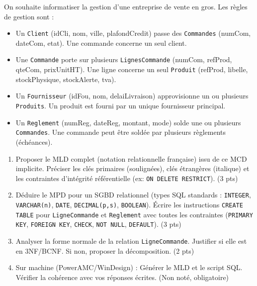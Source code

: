 \documentclass[11pt]{article}
\begin{document}
\begin{exercice}
On souhaite informatiser la gestion d'une entreprise de vente en gros. Les règles de gestion sont :
\begin{itemize}
    \item Un \texttt{Client} (idCli, nom, ville, plafondCredit) passe des \texttt{Commandes} (numCom, dateCom, etat). Une commande concerne un seul client.
    \item Une \texttt{Commande} porte sur plusieurs \texttt{LignesCommande} (numCom, refProd, qteCom, prixUnitHT). Une ligne concerne un seul \texttt{Produit} (refProd, libelle, stockPhysique, stockAlerte, tva).
    \item Un \texttt{Fournisseur} (idFou, nom, delaiLivraison) approvisionne un ou plusieurs \texttt{Produits}. Un produit est fourni par un unique fournisseur principal.
    \item Un \texttt{Reglement} (numReg, dateReg, montant, mode) solde une ou plusieurs \texttt{Commandes}. Une commande peut être soldée par plusieurs règlements (échéances).
\end{itemize}
\begin{enumerate}
    \item Proposer le MLD complet (notation relationnelle française) issu de ce MCD implicite. Préciser les clés primaires (soulignées), clés étrangères (italique) et les contraintes d'intégrité référentielle (ex: \texttt{ON DELETE RESTRICT}). (3 pts)
    \item Déduire le MPD pour un SGBD relationnel (types SQL standards : \texttt{INTEGER}, \texttt{VARCHAR(n)}, \texttt{DATE}, \texttt{DECIMAL(p,s)}, \texttt{BOOLEAN}). Écrire les instructions \texttt{CREATE TABLE} pour \texttt{LigneCommande} et \texttt{Reglement} avec toutes les contraintes (\texttt{PRIMARY KEY}, \texttt{FOREIGN KEY}, \texttt{CHECK}, \texttt{NOT NULL}, \texttt{DEFAULT}). (3 pts)
    \item Analyser la forme normale de la relation \texttt{LigneCommande}. Justifier si elle est en 3NF/BCNF. Si non, proposer la décomposition. (2 pts)
    \item Sur machine (PowerAMC/WinDesign) : Générer le MLD et le script SQL. Vérifier la cohérence avec vos réponses écrites. (Non noté, obligatoire)
\end{enumerate}
\end{exercice}
\end{document}
